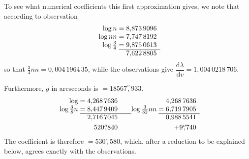 \par\noindent\hspace*{\parindent}To see what numerical coefficients this first
approximation gives, we note that according to observation
\[
\begin{array}{r@{\;}c@{\;}r}
\log n&=&8{,}873\,9096\\
\log nn&=&7{,}747\,8192\\
\log\tfrac34&=&9{,}875\,0613\\\cline{2-3}
&&7{,}622\,8805
\end{array}
\]
\noindent so that \(\tfrac34nn=0{,}004\,1964\,35\), while the observations give
\(\dfrac{\mathrm{d}\lambda}{\mathrm{d}v}=1{,}004\,0218\,706\).

\par\noindent\hspace*{\parindent}Furthermore, \(g\) in arcseconds is \(=18567\overset{\prime\prime}{,}933\).
\[
\begin{array}{r@{\;}c@{\;}r@{\qquad}r@{\;}c@{\;}r}
\log&=&4{,}268\,7636&&&4{,}268\,7636\\
\log\tfrac38n&=&8{,}447\,9409&\log\tfrac{3}{32}nn&=&6{,}719\,7905\\\cline{2-3}\cline{5-6}
&&2{,}716\,7045&&&0{,}988\,5541\\[3pt]
&&520\overset{\prime\prime}{,}840&&&+9\overset{\prime\prime}{,}740
\end{array}
\]
\noindent The coefficient is therefore \(=530\overset{\prime\prime}{,}580\), which, after a
reduction to be explained below, agrees exactly with the observations.
\clearpage
\endgroup
